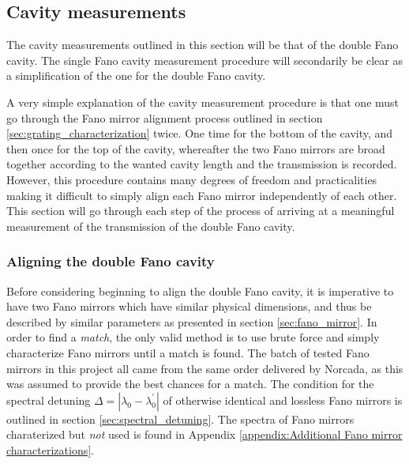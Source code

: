 \subsection{Cavity measurements}\label{sec:cavity_measurements}

The cavity measurements outlined in this section will be that of the double Fano cavity. The single Fano cavity measurement procedure will secondarily be clear as a simplification of the one for the double Fano cavity. 

A very simple explanation of the cavity measurement procedure is that one must go through the Fano mirror alignment process outlined in section \ref{sec:grating_characterization} twice. One time for the bottom of the cavity, and then once for the top of the cavity, whereafter the two Fano mirrors are broad together according to the wanted cavity length and the transmission is recorded. However, this procedure contains many degrees of freedom and practicalities making it difficult to simply align each Fano mirror independently of each other. This section will go through each step of the process of arriving at a meaningful measurement of the transmission of the double Fano cavity.

\subsubsection{Aligning the double Fano cavity}

Before considering beginning to align the double Fano cavity, it is imperative to have two Fano mirrors which have similar physical dimensions, and thus be described by similar parameters as presented in section \ref{sec:fano_mirror}. In order to find a \emph{match}, the only valid method is to use brute force and simply characterize Fano mirrors until a match is found. The batch of tested Fano mirrors in this project all came from the same order delivered by Norcada, as this was assumed to provide the best chances for a match. The condition for the spectral detuning $\Delta = |\lambda_{0} - \lambda^{\prime}_{0}|$ of otherwise identical and lossless Fano mirrors is outlined in section \ref{sec:spectral_detuning}. The spectra of Fano mirrors charaterized but \emph{not} used is found in Appendix \ref{appendix:Additional Fano mirror characterizations}.

